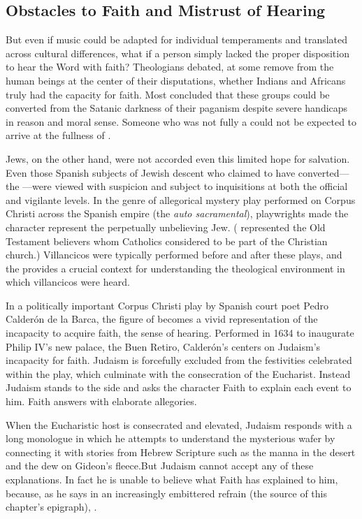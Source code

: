 \subsection{Obstacles to Faith and Mistrust of Hearing}

But even if music could be adapted for individual temperaments and translated across cultural differences, what if a person simply lacked the proper disposition to hear the Word with faith?
Theologians debated, at some remove from the human beings at the center of their disputations, whether Indians and Africans truly had the capacity for faith.\citXXX{}
Most concluded that these groups could be converted from the Satanic darkness of their paganism despite severe handicaps in reason and moral sense.
Someone who was not fully a  could not be expected to arrive at the fullness of .

Jews, on the other hand, were not accorded even this limited hope for salvation.
Even those Spanish subjects of Jewish descent who claimed to have converted---the ---were viewed with suspicion and subject to inquisitions at both the official and vigilante levels.\citXXX{}
In the genre of allegorical mystery play performed on  Corpus Christi across the Spanish empire (the \emph{auto sacramental}), playwrights made the character  represent the perpetually unbelieving Jew.\citXXX{}
( represented the Old Testament believers whom Catholics considered to be part of the Christian church.)\citXXX{}
Villancicos were typically performed before and after these plays, and the  provides a crucial context for understanding the theological environment in which villancicos were heard.

In a politically important Corpus Christi play by Spanish court poet Pedro Calderón de la Barca, the figure of  becomes a vivid representation of the incapacity to acquire faith,  the sense of hearing.
Performed in 1634 to inaugurate Philip IV's new palace, the Buen Retiro, Calderón's  centers on Judaism's incapacity for faith.%
  \autocite{Calderon:Retiro}
Judaism is forcefully excluded from the festivities celebrated within the play, which culminate with the consecration of the Eucharist.
Instead Judaism stands to the side and asks the character Faith to explain each event to him.
Faith answers with elaborate allegories.

When the Eucharistic host is consecrated and elevated, Judaism responds with a long monologue in which he attempts to understand the mysterious wafer by connecting it with stories from Hebrew Scripture such as the manna in the desert and the dew on Gideon's fleece.
But Judaism cannot accept any of these explanations.
In fact he is unable to believe what Faith has explained to him, because, as he says in an increasingly embittered refrain (the source of this chapter's epigraph), .

